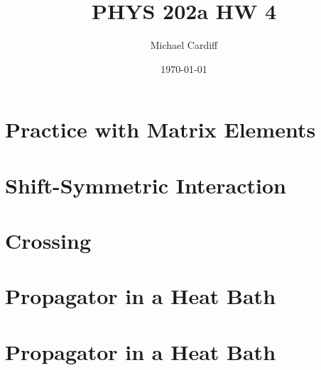 \documentclass[12pt]{article}
\title{\vspace{-3em}PHYS 202a HW 4}
\author{Michael Cardiff}
\date{\today}
\begin{document}
\maketitle

\section{Practice with Matrix Elements}

\section{Shift-Symmetric Interaction}

\section{Crossing}

\section{Propagator in a Heat Bath}
\section{Propagator in a Heat Bath}
\end{document}
